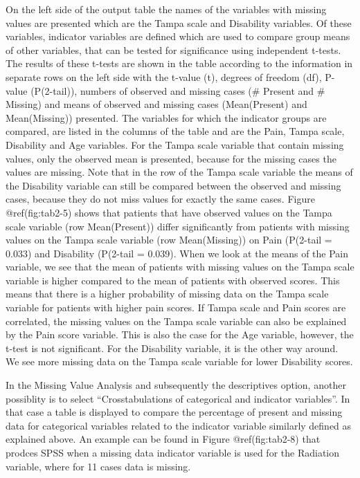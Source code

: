 \documentclass[
]{book}
\begin{document}
On the left side of the output table the names of the variables with
missing values are presented which are the Tampa scale and Disability
variables. Of these variables, indicator variables are defined which are
used to compare group means of other variables, that can be tested for
significance using independent t-tests. The results of these t-tests are
shown in the table according to the information in separate rows on the
left side with the t-value (t), degrees of freedom (df), P-value
(P(2-tail)), numbers of observed and missing cases (\# Present and \#
Missing) and means of observed and missing cases (Mean(Present) and
Mean(Missing)) presented. The variables for which the indicator groups
are compared, are listed in the columns of the table and are the Pain,
Tampa scale, Disability and Age variables. For the Tampa scale variable
that contain missing values, only the observed mean is presented,
because for the missing cases the values are missing. Note that in the
row of the Tampa scale variable the means of the Disability variable can
still be compared between the observed and missing cases, because they
do not miss values for exactly the same cases. Figure @ref(fig:tab2-5)
shows that patients that have observed values on the Tampa scale
variable (row Mean(Present)) differ significantly from patients with
missing values on the Tampa scale variable (row Mean(Missing)) on Pain
(P(2-tail = 0.033) and Disability (P(2-tail = 0.039). When we look at
the means of the Pain variable, we see that the mean of patients with
missing values on the Tampa scale variable is higher compared to the
mean of patients with observed scores. This means that there is a higher
probability of missing data on the Tampa scale variable for patients
with higher pain scores. If Tampa scale and Pain scores are correlated,
the missing values on the Tampa scale variable can also be explained by
the Pain score variable. This is also the case for the Age variable,
however, the t-test is not significant. For the Disability variable, it
is the other way around. We see more missing data on the Tampa scale
variable for lower Disability scores.

In the Missing Value Analysis and subsequently the descriptives option,
another possiblity is to select ``Crosstabulations of categorical and
indicator variables''. In that case a table is displayed to compare the
percentage of present and missing data for categorical variables related
to the indicator variable similarly defined as explained above. An
example can be found in Figure @ref(fig:tab2-8) that prodces SPSS when a
missing data indicator variable is used for the Radiation variable,
where for 11 cases data is missing.
\end{document}
